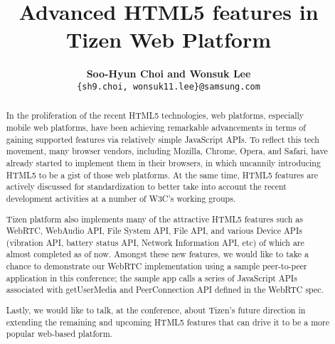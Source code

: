 \documentclass[a4paper]{./cls/spie}  %
\title{Advanced HTML5 features in Tizen Web Platform}
\author{{\normalsize{\bf Soo-Hyun Choi and Wonsuk Lee}}
\skiplinehalf
{\sf {\normalsize Next Generation S/W R\&D Group\\ Samsung Electronics, Co.,
Ltd.}}\\
{\tt {\small \{sh9.choi, wonsuk11.lee\}@samsung.com}}
}
\begin{document}
\maketitle

\begin{abstract}


In the proliferation of the recent HTML5 technologies, web platforms, especially 
mobile web platforms, have been achieving remarkable advancements in terms of 
gaining supported features via relatively simple JavaScript APIs. To reflect 
this tech movement, many browser vendors, including Mozilla, Chrome, Opera, and 
Safari, have already started to implement them in their browsers, in which 
uncannily introducing HTML5 to be a gist of those web platforms. At the same 
time, HTML5 features are actively discussed for standardization to better take 
into account the recent development activities at a number of W3C's working 
groups.

Tizen platform also implements many of the attractive HTML5 features such as
WebRTC, WebAudio API, File System API, File API, and various Device APIs 
(vibration API, battery status API, Network Information API, etc) of which are 
almost completed as of now. Amongst these new features, we would like to take a 
chance to demonstrate our WebRTC implementation using a sample peer-to-peer 
application in this conference; the sample app calls a series of JavaScript APIs 
associated with {\sf getUserMedia} and {\sf PeerConnection API} defined in the 
WebRTC spec\cite{webrtc.w3c}.

Lastly, we would like to talk, at the conference, about Tizen's future direction 
in extending the remaining and upcoming HTML5 features that can drive it to be a 
more popular web-based platform.




\end{abstract}
\end{document}
